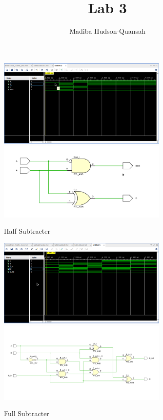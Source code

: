 \documentclass[12pt letter]{report}
\title{\Huge{Lab 3}}
\author{\huge{Madiba Hudson-Quansah}}
\date{}
\begin{document}
\maketitle
\newpage


\begin{figure}[H]
  \centering
  \includegraphics[width=0.75\textwidth]{halfbit_sig.png}
  \includegraphics[width=0.75\textwidth]{halfbit_sch.png}
  \caption{Half Subtracter}
\end{figure}

\begin{figure}[H]
  \centering
  \includegraphics[width=0.75\textwidth]{fullbit_sig.png}
  \includegraphics[width=0.75\textwidth]{fullbit_sch.png}
  \caption{Full Subtracter}
\end{figure}
\end{document}
